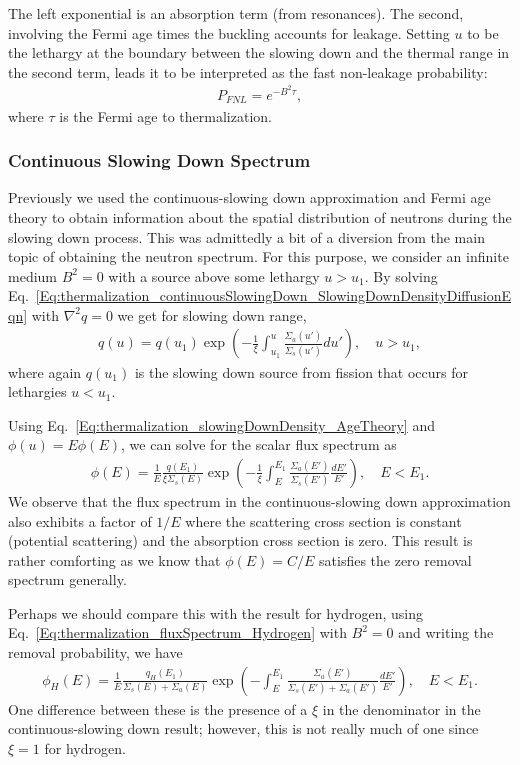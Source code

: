 The left exponential is an absorption term (from resonances). The second, involving the Fermi age times the buckling accounts for leakage. Setting $u$ to be the lethargy at the boundary between the slowing down and the thermal range in the second term, leads it to be interpreted as the fast non-leakage probability:
\begin{align}
  P_{FNL} = e^{-B^2\tau},
\end{align}
where $\tau$ is the Fermi age to thermalization.

\subsubsection{Continuous Slowing Down Spectrum}

Previously we used the continuous-slowing down approximation and Fermi age theory to obtain information about the spatial distribution of neutrons during the slowing down process. This was admittedly a bit of a diversion from the main topic of obtaining the neutron spectrum. For this purpose, we consider an infinite medium $B^2 = 0$ with a source above some lethargy $u > u_1$. By solving Eq.~\eqref{Eq:thermalization_continuousSlowingDown_SlowingDownDensityDiffusionEqn} with $\nabla^2 q = 0$ we get for slowing down range,
\begin{align}
  q(u) = q(u_1) \exp \left( -\frac{1}{\xi} \int_{u_1}^u \frac{\Sigma_a(u')}{\Sigma_s(u')} du' \right) , \quad u > u_1,
\end{align}
where again $q(u_1)$ is the slowing down source from fission that occurs for lethargies $u < u_1$.

Using Eq.~\eqref{Eq:thermalization_slowingDownDensity_AgeTheory} and $\phi(u) = E\phi(E)$, we can solve for the scalar flux spectrum as
\begin{align}
  \phi(E) = \frac{1}{E} \frac{q(E_1)}{\xi \Sigma_s(E) } \exp \left( -\frac{1}{\xi} \int_E^{E_1} \frac{\Sigma_a(E')}{\Sigma_s(E')} \frac{dE'}{E'} \right) , \quad E < E_1 . \label{Eq:thermalization_fluxSpectrum_continuousSlowingDown}
\end{align}
We observe that the flux spectrum in the continuous-slowing down approximation also exhibits a factor of $1/E$ where the scattering cross section is constant (potential scattering) and the absorption cross section is zero. This result is rather comforting as we know that $\phi(E) = C/E$ satisfies the zero removal spectrum generally. 

Perhaps we should compare this with the result for hydrogen, using Eq.~\eqref{Eq:thermalization_fluxSpectrum_Hydrogen} with $B^2 = 0$ and writing the removal probability, we have
\begin{align}
  \phi_H(E) = \frac{1}{E} \frac{ q_H(E_1) }{ \Sigma_s(E) + \Sigma_a(E) } \exp\left( -\int_E^{E_1} \frac{ \Sigma_a(E') }{ \Sigma_s(E') + \Sigma_a(E') }  \frac{dE'}{E'}  \right) , \quad E < E_1 .
\end{align}
One difference between these is the presence of a $\xi$ in the denominator in the continuous-slowing down result; however, this is not really much of one since $\xi = 1$ for hydrogen. 

